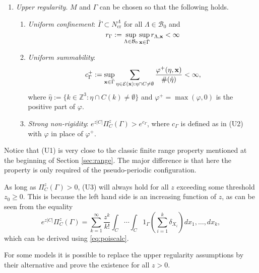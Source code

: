 \begin{enumerate}[\textbf{(U)}] 
	\item \textit{Upper regularity}. $M$ and $\Gamma$ can be chosen so that the following holds. 
		\begin{enumerate}[(U1)]
			\item \textit{Uniform confinement}: $\bar \Gamma \subset N^\Lambda_\text{cr}$ for all $\Lambda \in \mathcal B_0$ and 
			\begin{equation}\label{eq:U1}r_\Gamma := \sup_{\Lambda\in\mathcal B_0}\sup_{{\mathbf{x}} \in \bar\Gamma} r_{\Lambda, {\mathbf{x}}} < \infty\end{equation}
			\item \textit{Uniform summability}: 
			$$c^+_\Gamma := \sup_{{\mathbf{x}} \in \bar\Gamma}  \sum_{\eta \in \mathcal E({\mathbf{x}}): \eta \cap C \neq \emptyset} \frac{\varphi^+(\eta,{\mathbf{x}})}{\#(\hat\eta)} < \infty,$$
where $\hat\eta := \{k \in \mathbb Z^3: \eta \cap C(k) \neq \emptyset\}$ and $\varphi^+ = \max(\varphi,0)$ is the positive part of $\varphi$.
\item \textit{Strong non-rigidity}: $e^{z|C|} \Pi^z_C(\Gamma) > e^{c_\Gamma}$, where $c_\Gamma$ is defined as in (U2) with $\varphi$ in place of $\varphi^+$.
		\end{enumerate}
\end{enumerate}

Notice that (U1) is very close to the classic finite range property mentioned at the beginning of Section \ref{sec:range}. The major difference is that here the property is only required of the pseudo-periodic configuration.


As long as $\Pi^z_C (\Gamma) >0$, (U3) will always hold for all $z$ exceeding some threshold $z_0 \geq 0$. This is because the left hand side is an increasing function of $z$, as can be seen from the equality 
$$e^{z|C|} \Pi^z_C(\Gamma) = \sum^\infty_{k=1} \frac{z^k}{k!} \int_C \cdots \int_C 1_{\Gamma} \left(\sum^k_{i=1} \delta_{X_i}\right) dx_1, \dots, dx_k,$$
which can be derived using \ref{eq:poiscalc}. 



For some models it is possible to replace the upper regularity assumptions by their alternative and prove the existence for all $z>0$.

